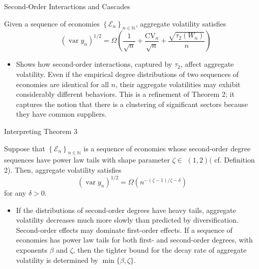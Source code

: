 \documentclass[dvipsnames]{beamer}
\begin{document}
\begin{frame}{Second-Order Interactions and Cascades}
  \begin{theorem}[Theorem 3]
    Given a sequence of economies $\left\{\mathcal{E}_{n}\right\}_{n \in \mathbb{N}}$, aggregate volatility satisfies
 \[\quad\left(\operatorname{var} y_{n}\right)^{1 / 2}=\Omega\left(\frac{1}{\sqrt{n}}+\frac{\mathrm{CV}_{n}}{\sqrt{n}}+\frac{\sqrt{\tau_{2}\left(W_{n}\right)}}{n}\right)\]
  \end{theorem}
  \begin{itemize}
  \item Shows how second-order interactions, captured by $\tau_2$, affect aggregate volatility.
    \vitem Even if the empirical degree distributions of two sequences of economies are identical for all $n$, their aggregate volatilities may exhibit considerably different behaviors.
    \vitem This is a refinement of Theorem 2; it captures the notion that there is a clustering of significant sectors because they have common suppliers.
  \end{itemize}
\end{frame}
%
\begin{frame}{Interpreting Theorem 3}
  \begin{corollary}[Corollary 2]
     Suppose that $\left\{\mathcal{E}_{n}\right\}_{n \in \mathbb{N}}$ is a sequence of economies whose second-order degree sequences have power law tails with shape parameter $\zeta \in$ $(1,2)($ cf. Definition 2). Then, aggregate volatility satisfies
$$
\left(\operatorname{var} y_{n}\right)^{1 / 2}=\Omega\left(n^{-(\zeta-1) / \zeta-\delta}\right)
$$
for any $\delta>0$.
  \end{corollary}
  \begin{itemize}
  \item If the distributions of second-order degrees have heavy tails, aggregate volatility decreases much more slowly than predicted by diversification.
    \vitem Second-order effects may dominate first-order effects.
    \vitem If a sequence of economies has power law tails for both first- and second-order degrees, with exponents $\beta$ and $\zeta$, then the tighter bound for the decay rate of aggregate volatility is determined by $\min \{\beta, \zeta\}$.
  \end{itemize}
\end{frame}
%
\end{document}
